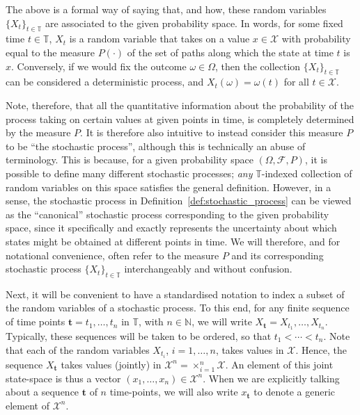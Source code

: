 \documentclass[graybox]{svmult}
\newcommand{\nats}{\mathbb{N}}
\newcommand{\states}{\mathcal{X}}
\newcommand{\timedim}{\mathbb{T}}
\begin{document}
The above is a formal way of saying that, and how, these random variables $\{X_t\}_{t\in\timedim}$ are associated to the given probability space. In words, for some fixed time $t\in\timedim$, $X_t$ is a random variable that takes on a value $x\in\states$ with probability equal to the measure $P(\cdot)$ of the set of paths along which the state at time $t$ is $x$. Conversely, if we would fix the outcome $\omega\in\Omega$, then the collection $\{X_t\}_{t\in\timedim}$ can be considered a deterministic process, and $X_t(\omega)=\omega(t)$ for all $t\in\states$.

Note, therefore, that all the quantitative information about the probability of the process taking on certain values at given points in time, is completely determined by the measure $P$. It is therefore also intuitive to instead consider this measure $P$ to be ``the stochastic process'', although this is technically an abuse of terminology. This is because, for a given probability space $(\Omega,\mathcal{F},P)$, it is possible to define many different stochastic processes; \emph{any} $\timedim$-indexed collection of random variables on this space satisfies the general definition. However, in a sense, the stochastic process in Definition~\ref{def:stochastic_process} can be viewed as the ``canonical'' stochastic process corresponding to the given probability space, since it specifically and exactly represents the uncertainty about which states might be obtained at different points in time. We will therefore, and for notational convenience, often refer to the measure $P$ and its corresponding stochastic process $\{X_t\}_{t\in\timedim}$ interchangeably and without confusion.

Next, it will be convenient to have a standardised notation to index a subset of the random variables of a stochastic process. To this end, for any finite sequence of time points $\mathbf{t}=t_1,\ldots,t_n$ in $\timedim$, with $n\in\nats$, we will write $X_\mathbf{t}=X_{t_1},\ldots,X_{t_n}$. Typically, these sequences will be taken to be ordered, so that $t_1<\cdots<t_n$. Note that each of the random variables $X_{t_i}$, $i=1,\ldots,n$, takes values in $\states$. Hence, the sequence $X_\mathbf{t}$ takes values (jointly) in $\states^n=\times_{i=1}^n\states$. An element of this joint state-space is thus a vector $(x_1,\ldots,x_n)\in\states^n$. When we are explicitly talking about a sequence $\mathbf{t}$ of $n$ time-points, we will also write $x_\mathbf{t}$ to denote a generic element of $\states^n$.
\end{document}
